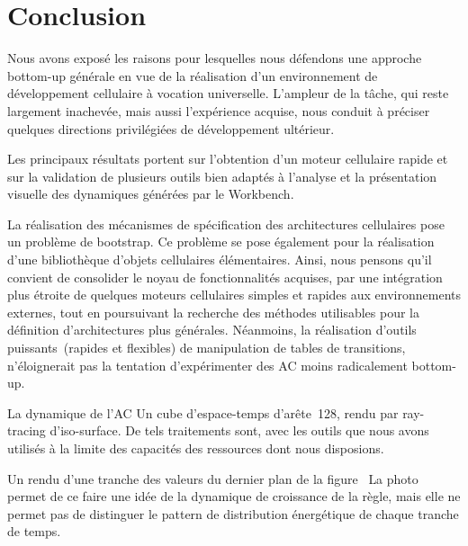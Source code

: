 \chapter{Conclusion}

Nous avons exposé les raisons pour lesquelles nous défendons une
approche bottom-up générale en vue de la réalisation d'un
environnement de développement cellulaire à vocation universelle. %
L'ampleur de la tâche, qui reste largement inachevée, mais aussi
l'expérience acquise, nous conduit à préciser quelques directions
privilégiées de développement ultérieur.

Les principaux résultats portent sur l'obtention d'un moteur
cellulaire rapide et sur la validation de plusieurs outils bien
adaptés à l'analyse et la présentation visuelle des dynamiques
générées par le Workbench.

La réalisation des mécanismes de spécification des architectures
cellulaires pose un problème de bootstrap. %
Ce problème se pose également pour la réalisation d'une bibliothèque
d'objets cellulaires élémentaires. %
Ainsi, nous pensons qu'il convient de consolider le noyau de
fonctionnalités acquises, par une intégration plus étroite de quelques
moteurs cellulaires simples et rapides aux environnements externes,
tout en poursuivant la recherche des méthodes utilisables pour la
définition d'architectures plus générales. %
Néanmoins, la réalisation d'outils puissants~(rapides et flexibles) de
manipulation de tables de transitions, n'éloignerait pas la tentation
d'expérimenter des AC moins radicalement bottom-up.


%
{}
{La dynamique de l'AC }%
{Un cube d'espace-temps d'arête~128, rendu par ray-tracing
  d'iso-sur\-face. %
  De tels traitements sont, avec les outils que nous avons utilisés à
  la limite des capacités des ressources dont nous disposions.}

%
{}%
{Un rendu d'une tranche des valeurs du dernier
  plan de la figure~\protect{}}%
{La photo~ permet de ce faire une idée de la
  dynamique de croissance de la règle, mais elle ne permet pas de
  distinguer le pattern de distribution énergétique de chaque tranche
  de temps.}

